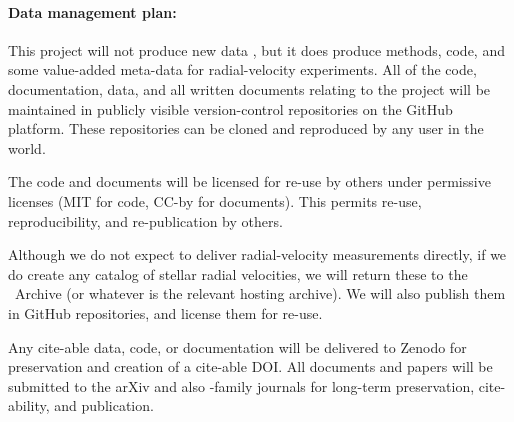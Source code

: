 \documentclass[12pt, fullpage, letterpaper]{article}
\begin{document}
\paragraph{Data management plan:}
This project will not produce new data , but it does produce
methods, code, and some value-added meta-data for radial-velocity experiments.
All of the code, documentation, data, and all written documents relating to the
project will be maintained in publicly visible version-control repositories on
the GitHub platform. These repositories can be cloned and reproduced by any
user in the world.

The code and documents will be licensed for re-use by others under permissive
licenses (MIT for code, CC-by for documents). This permits re-use, reproducibility,
and re-publication by others.

Although we do not expect to deliver radial-velocity measurements directly, if
we do create any catalog of stellar radial velocities, we will return these to
the \HARPS\ Archive (or whatever is the relevant hosting archive). We will also
publish them in GitHub repositories, and license them for re-use.

Any cite-able data, code, or documentation will be delivered to Zenodo for
preservation and creation of a cite-able DOI.
All documents and papers will be submitted to the arXiv and also \AAS-family
journals for long-term preservation, cite-ability, and publication.
\end{document}
